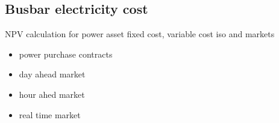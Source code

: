 

\subsection{Busbar electricity cost}
NPV calculation for power asset
fixed cost, variable cost
iso and markets
\begin{itemize}
\item power purchase contracts
\item day ahead market
\item hour ahed market
\item real time market
\end{itemize}



